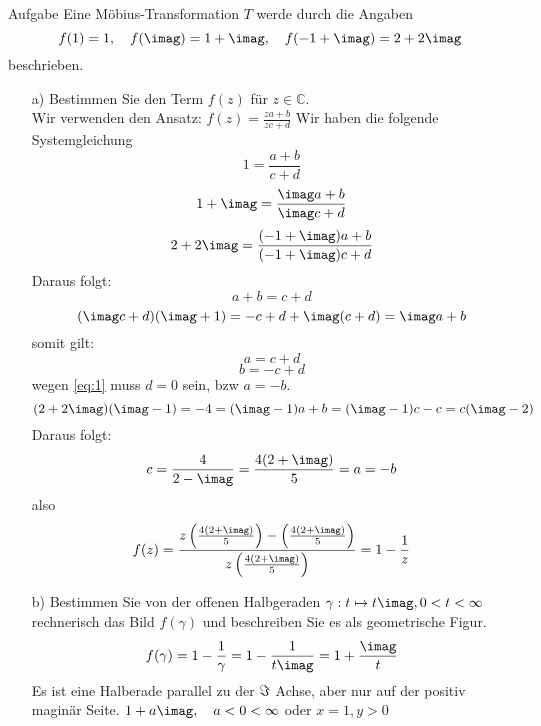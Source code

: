\documentclass{scrartcl}
\def\mbb#1{\mathbb{#1}}
\def\bC{\mbb{C}}
\begin{document}
\begin{section}{Aufgabe}%
Eine Möbius-Transformation $T$ werde durch die Angaben
\[f(1)=1,\quad f(\imag)=1+\imag,\quad f(-1+\imag)=2+2\imag\]
beschrieben.
\begin{itemize}
\item[a)]
Bestimmen Sie den Term $f(z)$ für $z \in \bC$.\\
Wir verwenden den Ansatz: \(f(z)=\frac{z a+b}{z c+d}\)
Wir haben die folgende Systemgleichung
\[1=\frac{a+b}{c+d}\]
\[1+\imag=\frac{\imag a+b}{\imag c+d}\]
\[2+2\imag=\frac{(-1+\imag)a+b}{(-1+\imag)c+d}\]
Daraus folgt:
\begin{equation}
    a+b=c+d \label{eq:1}
\end{equation}
\[(\imag c+d)(\imag+1)=-c+d+\imag(c+d)=\imag a+b\]
somit gilt:
\[a=c+d\]
\[b=-c+d\]
wegen \eqref{eq:1} muss $d=0$ sein, bzw $a=-b$.
\[(2+2\imag)(\imag-1)=-4=(\imag-1)a+b=(\imag-1)c-c=c(\imag-2)\]
Daraus folgt:
\[c=\frac{4}{2-\imag}=\frac{4 (2+\imag)}{5}=a=-b\]
also
\[f(z)=\frac{z \left(\frac{4 (2+\imag)}{5}\right)-\left(\frac{4 (2+\imag)}{5}\right)}{z \left(\frac{4 (2+\imag)}{5}\right)}=1-\frac{1}{z}\]
\item[b)]
Bestimmen Sie von der offenen Halbgeraden $\gamma : t \mapsto t \imag, 0 < t < \infty$ rechnerisch
das Bild $f(\gamma)$ und beschreiben Sie es als geometrische Figur.
\[f(\gamma)=1-\frac{1}{\gamma}=1-\frac{1}{t \imag}=1+\frac{\imag}{t}\]
Es ist eine Halberade parallel zu der $\imaginary$ Achse, aber nur auf der positiv maginär Seite. $1+a \imag,\quad a<0<\infty$
oder $x=1,y>0$



\end{itemize}
\end{section}
\end{document}
